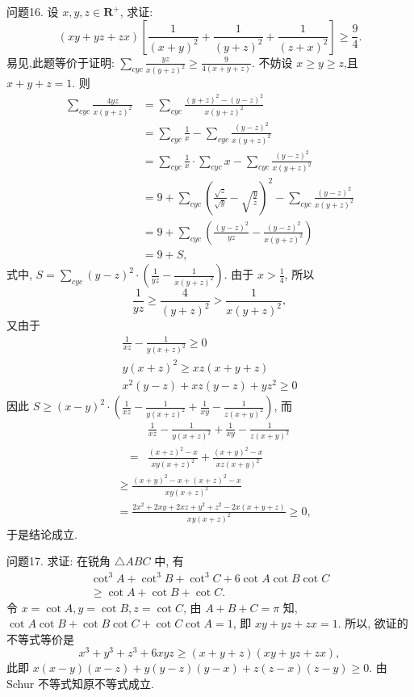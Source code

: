 问题16. 设 $x, y, z \in \mathbf{R}^{+}$, 求证:
$$
(x y+y z+z x)\left[\frac{1}{(x+y)^2}+\frac{1}{(y+z)^2}+\frac{1}{(z+x)^2}\right] \geqslant \frac{9}{4} .
$$
易见,此题等价于证明: $\sum_{c y c} \frac{y z}{x(y+z)^2} \geqslant \frac{9}{4(x+y+z)}$.
不妨设 $x \geqslant y \geqslant z$,且 $x+y+z=1$. 则
$$
\begin{aligned}
\sum_{c y c} \frac{4 y z}{x(y+z)^2} & =\sum_{c y c} \frac{(y+z)^2-(y-z)^2}{x(y+z)^2} \\
& =\sum_{c y c} \frac{1}{x}-\sum_{c y c} \frac{(y-z)^2}{x(y+z)^2} \\
& =\sum_{c y c} \frac{1}{x} \cdot \sum_{c y c} x-\sum_{c y c} \frac{(y-z)^2}{x(y+z)^2} \\
& =9+\sum_{c y c}\left(\frac{\sqrt{z}}{\sqrt{y}}-\sqrt{\frac{y}{z}}\right)^2-\sum_{c y c} \frac{(y-z)^2}{x(y+z)^2} \\
& =9+\sum_{c y c}\left(\frac{(y-z)^2}{y z}-\frac{(y-z)^2}{x(y+z)^2}\right) \\
& =9+S,
\end{aligned}
$$
式中, $S=\sum_{c y c}(y-z)^2 \cdot\left(\frac{1}{y z}-\frac{1}{x(y+z)^2}\right)$.
由于 $x>\frac{1}{4}$, 所以
$$
\frac{1}{y z} \geqslant \frac{4}{(y+z)^2}>\frac{1}{x(y+z)^2},
$$
又由于
$$
\begin{gathered}
\frac{1}{x z}-\frac{1}{y(x+z)^2} \geqslant 0 \\
y(x+z)^2 \geqslant x z(x+y+z) \\
x^2(y-z)+x z(y-z)+y z^2 \geqslant 0
\end{gathered}
$$
因此 $S \geqslant(x-y)^2 \cdot\left(\frac{1}{x z}-\frac{1}{y(x+z)^2}+\frac{1}{x y}-\frac{1}{z(x+y)^2}\right)$,
而
$$
\begin{aligned}
& \frac{1}{x z}-\frac{1}{y(x+z)^2}+\frac{1}{x y}-\frac{1}{z(x+y)^2} \\
= & \frac{(x+z)^2-x}{x y(x+z)^2}+\frac{(x+y)^2-x}{x z(x+y)^2}
\end{aligned}
$$
$$
\begin{aligned}
& \geqslant \frac{(x+y)^2-x+(x+z)^2-x}{x y(x+z)^2} \\
& =\frac{2 x^2+2 x y+2 x z+y^2+z^2-2 x(x+y+z)}{x y(x+z)^2} \geqslant 0,
\end{aligned}
$$
于是结论成立.



问题17. 求证: 在锐角 $\triangle A B C$ 中, 有
$$
\begin{gathered}
\cot ^3 A+\cot ^3 B+\cot ^3 C+6 \cot A \cot B \cot C \\
\geqslant \cot A+\cot B+\cot C .
\end{gathered}
$$
令 $x=\cot A, y=\cot B, z=\cot C$, 由 $A+B+C=\pi$ 知, $\cot A \cot B+ \cot B \cot C+\cot C \cot A=1$, 即 $x y+y z+z x=1$. 所以, 欲证的不等式等价是
$$
x^3+y^3+z^3+6 x y z \geqslant(x+y+z)(x y+y z+z x),
$$
此即 $x(x-y)(x-z)+y(y-z)(y-x)+z(z-x)(z-y) \geqslant 0$.
由 Schur 不等式知原不等式成立.



